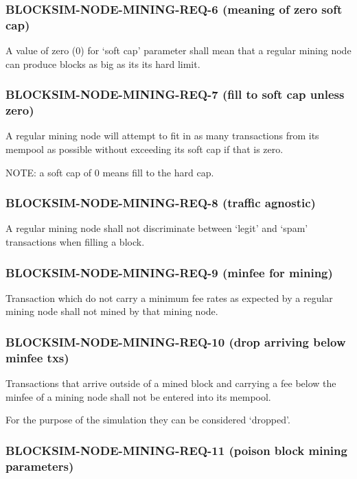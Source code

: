 \documentclass{scrreprt}
\begin{document}
      \subsubsection{BLOCKSIM-NODE-MINING-REQ-6 (meaning of zero soft cap)}

        A value of zero (0) for `soft cap' parameter shall mean that a regular
        mining node can produce blocks as big as its its hard limit.

      \subsubsection{BLOCKSIM-NODE-MINING-REQ-7 (fill to soft cap unless zero)}

        A regular mining node will attempt to fit in as many transactions
        from its mempool as possible without exceeding its soft cap if
        that is zero.

        NOTE: a soft cap of 0 means fill to the hard cap.

      \subsubsection{BLOCKSIM-NODE-MINING-REQ-8 (traffic agnostic)}

        A regular mining node shall not discriminate between `legit' and `spam'
        transactions when filling a block.

      \subsubsection{BLOCKSIM-NODE-MINING-REQ-9 (minfee for mining)}

        Transaction which do not carry a minimum fee rates as expected by a
        regular mining node shall not mined by that mining node.

      \subsubsection{BLOCKSIM-NODE-MINING-REQ-10 (drop arriving below minfee txs)}

        Transactions that arrive outside of a mined block and carrying a fee
        below the minfee of a mining node shall not be entered into its mempool.

        For the purpose of the simulation they can be considered `dropped'.

      \subsubsection{BLOCKSIM-NODE-MINING-REQ-11 (poison block mining parameters)}
\end{document}
